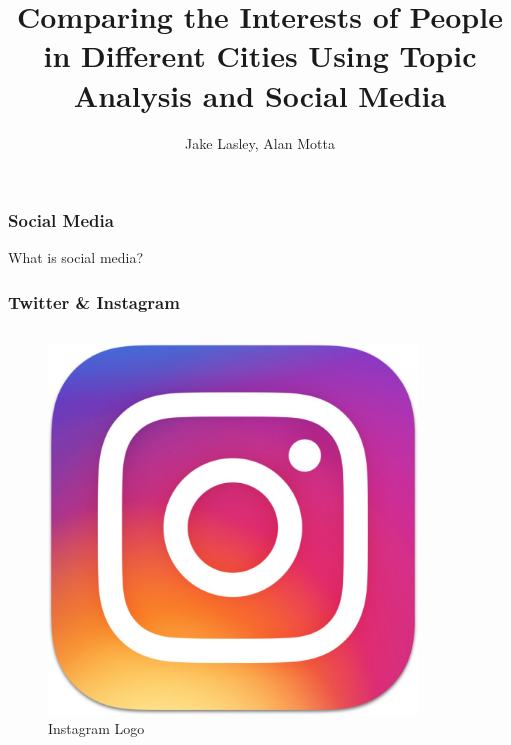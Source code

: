\documentclass[pdf]{beamer}
\title{Comparing the Interests of People in Different Cities Using Topic Analysis and Social Media}
\subtitle{}
\author{Jake Lasley, Alan Motta}
\begin{document}
\begin{frame}
  \titlepage

\end{frame}

\begin{frame}
  \frametitle{Social Media}
  What is social media?
\end{frame}

\begin{frame}
  \frametitle{Twitter \& Instagram}
  \begin{columns}
    \begin{column}{0.5\textwidth}
      \begin{figure}[ht]
        \centering
        \includegraphics[width=\linewidth]{figures/instagram_logo.jpeg}
        \caption{Instagram Logo}
        \label{fig:ig_logo}
      \end{figure}
    \end{column}
    \begin{column}{0.5\textwidth}
      \begin{figure}[ht]
        \centering

\end{figure}
\end{column}
\end{columns}
\end{frame}
\end{document}
